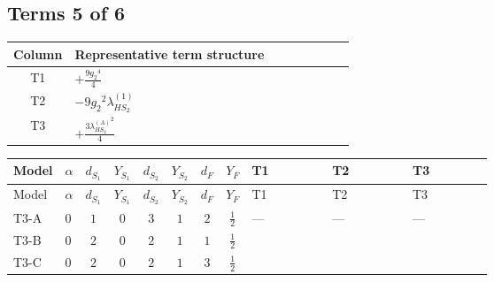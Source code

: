 \documentclass[8pt]{article}
\begin{document}
\begin{landscape}
\subsection*{Terms 5 of 6}
\begin{center}
\begin{tabular}{@{}c >{\raggedright\arraybackslash}p{0.82\linewidth}@{}}
\toprule
Column & Representative term structure \\
\midrule
T1 & \(\displaystyle +\frac{9 {g_2}^4}{4}\) \\
\midrule
T2 & \(\displaystyle -9 {g_2}^2 {\lambda_{HS_2}^{(1)}}\) \\
\midrule
T3 & \(\displaystyle +\frac{3 {\lambda_{HS_2}^{(A)}}^2}{4}\) \\
\midrule
\bottomrule
\end{tabular}
\end{center}
\smallskip
\tiny
\begin{longtable}{@{}llcccccc >{\raggedright\arraybackslash}p{0.21\linewidth} >{\raggedright\arraybackslash}p{0.21\linewidth} >{\raggedright\arraybackslash}p{0.21\linewidth}@{}}
\toprule
Model & $\alpha$ & $d_{S_1}$ & $Y_{S_1}$ & $d_{S_2}$ & $Y_{S_2}$ & $d_F$ & $Y_F$ & T1 & T2 & T3 \\
\midrule
\endfirsthead
\toprule
Model & $\alpha$ & $d_{S_1}$ & $Y_{S_1}$ & $d_{S_2}$ & $Y_{S_2}$ & $d_F$ & $Y_F$ & T1 & T2 & T3 \\
\midrule
\endhead
T3-A & $0$ & $1$ & $0$ & $3$ & $1$ & $2$ & $\frac{1}{2}$ & --- & --- & --- \\
\midrule
T3-B & $0$ & $2$ & $0$ & $2$ & $1$ & $1$ & $\frac{1}{2}$ & \scriptsize\adjustbox{max width=\linewidth}{$\begin{gathered} +\frac{9 {g_2}^4}{4}\end{gathered}$} & \scriptsize\adjustbox{max width=\linewidth}{$\begin{gathered} -9 {g_2}^2 {\lambda_{HS_2}^{(1)}}\end{gathered}$} & \scriptsize\adjustbox{max width=\linewidth}{$\begin{gathered} +\frac{3 {\lambda_{HS_2}^{(A)}}^2}{4}\end{gathered}$} \\
\midrule
T3-C & $0$ & $2$ & $0$ & $2$ & $1$ & $3$ & $\frac{1}{2}$ & \scriptsize\adjustbox{max width=\linewidth}{$\begin{gathered} +\frac{9 {g_2}^4}{4}\end{gathered}$} & \scriptsize\adjustbox{max width=\linewidth}{$\begin{gathered} -9 {g_2}^2 {\lambda_{HS_2}^{(1)}}\end{gathered}$} & \scriptsize\adjustbox{max width=\linewidth}{$\begin{gathered} +\frac{3 {\lambda_{HS_2}^{(A)}}^2}{4}\end{gathered}$} \\

\end{longtable}
\end{landscape}
\end{document}
